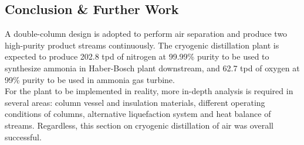 \subsection{Conclusion \& Further Work}
\noindent A double-column design is adopted to perform air separation and produce two high-purity product streams continuously. The cryogenic distillation plant is expected to produce 202.8 tpd of nitrogen at 99.99\% purity to be used to synthesize ammonia in Haber-Bosch plant downstream, and 62.7 tpd of oxygen at 99\% purity to be used in ammonia gas turbine. \\
For the plant to be implemented in reality, more in-depth analysis is required in several areas: column vessel and insulation materials, different operating conditions of columns, alternative liquefaction system and heat balance of streams. Regardless, this section on cryogenic distillation of air was overall successful.
